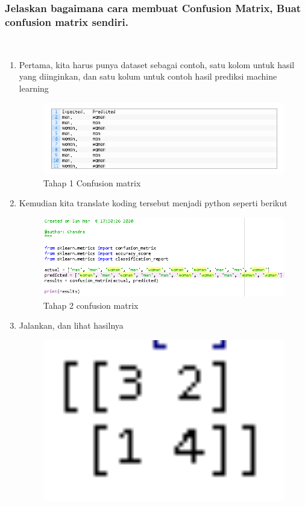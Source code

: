 \subsubsection{Jelaskan bagaimana cara membuat Confusion Matrix, Buat confusion matrix sendiri.}
\hfill\\
\begin{enumerate}
    \item Pertama, kita harus punya dataset sebagai contoh, satu kolom untuk hasil yang diinginkan, dan satu kolum untuk contoh hasil prediksi machine learning
\begin{figure}[H]
    \includegraphics[width=12cm]{figures/1174079/2/confusionmatrixcara1.PNG}
    \centering
    \caption{Tahap 1 Confusion matrix}
\end{figure}	
    \item Kemudian kita translate koding tersebut menjadi python seperti berikut
\begin{figure}[H]
    \includegraphics[width=12cm]{figures/1174079/2/confusionmatrixcara2.PNG}
    \centering
    \caption{Tahap 2 confusion matrix}
\end{figure}	
    \item Jalankan, dan lihat hasilnya
\begin{figure}[H]
    \includegraphics[width=12cm]{figures/1174079/2/confusionmatrixcara3.PNG}

\end{figure}
\end{enumerate}
